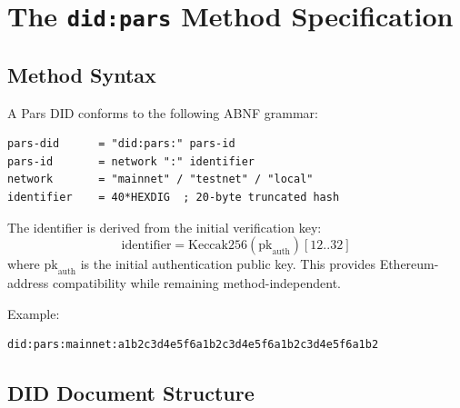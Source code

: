 \documentclass[11pt,a4paper]{article}
\begin{document}
\section{The \texttt{did:pars} Method Specification}
\label{sec:did-method}

\subsection{Method Syntax}

A Pars DID conforms to the following ABNF grammar:

\begin{lstlisting}[language={},caption={did:pars ABNF syntax}]
pars-did      = "did:pars:" pars-id
pars-id       = network ":" identifier
network       = "mainnet" / "testnet" / "local"
identifier    = 40*HEXDIG  ; 20-byte truncated hash
\end{lstlisting}

The identifier is derived from the initial verification key:
\[
    \text{identifier} = \text{Keccak256}(\text{pk}_{\text{auth}})[12..32]
\]
where $\text{pk}_{\text{auth}}$ is the initial authentication public key. This provides
Ethereum-address compatibility while remaining method-independent.

Example:
\begin{verbatim}
did:pars:mainnet:a1b2c3d4e5f6a1b2c3d4e5f6a1b2c3d4e5f6a1b2
\end{verbatim}

\subsection{DID Document Structure}
\end{document}
